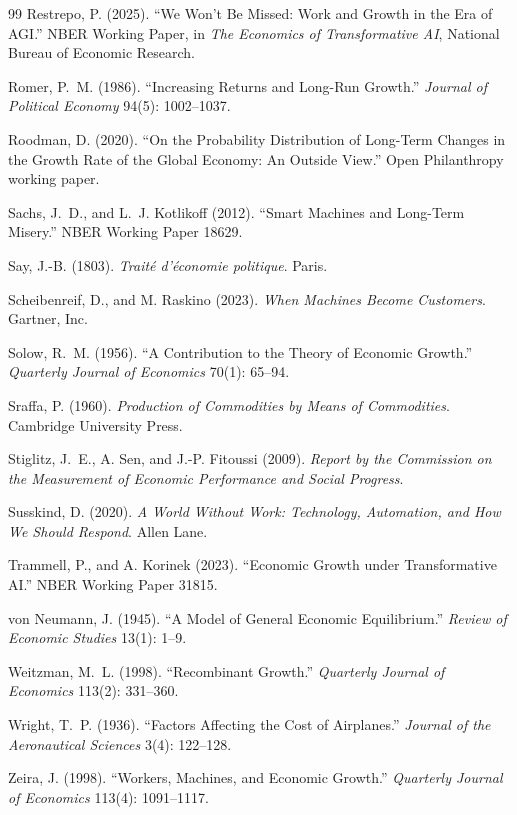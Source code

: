 \documentclass[11pt]{article}
\begin{document}
\begin{thebibliography}{99}
Restrepo, P. (2025). ``We Won't Be Missed: Work and Growth in the Era of AGI.'' NBER Working Paper, in \emph{The Economics of Transformative AI}, National Bureau of Economic Research.

Romer, P.~M. (1986). ``Increasing Returns and Long-Run Growth.'' \emph{Journal of Political Economy} 94(5): 1002--1037.

Roodman, D. (2020). ``On the Probability Distribution of Long-Term Changes in the Growth Rate of the Global Economy: An Outside View.'' Open Philanthropy working paper.

Sachs, J.~D., and L.~J. Kotlikoff (2012). ``Smart Machines and Long-Term Misery.'' NBER Working Paper 18629.

Say, J.-B. (1803). \emph{Trait\'e d'\'economie politique}. Paris.

Scheibenreif, D., and M. Raskino (2023). \emph{When Machines Become Customers}. Gartner, Inc.

Solow, R.~M. (1956). ``A Contribution to the Theory of Economic Growth.'' \emph{Quarterly Journal of Economics} 70(1): 65--94.

Sraffa, P. (1960). \emph{Production of Commodities by Means of Commodities}. Cambridge University Press.

Stiglitz, J.~E., A. Sen, and J.-P. Fitoussi (2009). \emph{Report by the Commission on the Measurement of Economic Performance and Social Progress}.

Susskind, D. (2020). \emph{A World Without Work: Technology, Automation, and How We Should Respond}. Allen Lane.

Trammell, P., and A. Korinek (2023). ``Economic Growth under Transformative AI.'' NBER Working Paper 31815.

von Neumann, J. (1945). ``A Model of General Economic Equilibrium.'' \emph{Review of Economic Studies} 13(1): 1--9.

Weitzman, M.~L. (1998). ``Recombinant Growth.'' \emph{Quarterly Journal of Economics} 113(2): 331--360.

Wright, T.~P. (1936). ``Factors Affecting the Cost of Airplanes.'' \emph{Journal of the Aeronautical Sciences} 3(4): 122--128.

Zeira, J. (1998). ``Workers, Machines, and Economic Growth.'' \emph{Quarterly Journal of Economics} 113(4): 1091--1117.

\end{thebibliography}
\end{document}
